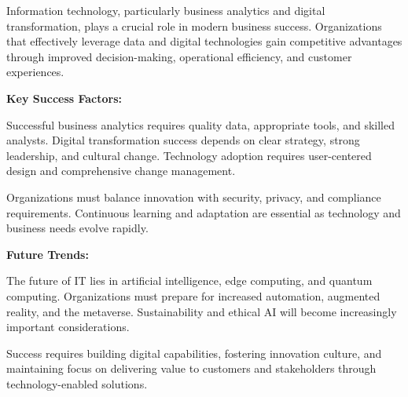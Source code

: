 \documentclass[12pt]{article}
\begin{document}
Information technology, particularly business analytics and digital transformation, plays a crucial role in modern business success. Organizations that effectively leverage data and digital technologies gain competitive advantages through improved decision-making, operational efficiency, and customer experiences.

\textbf{Key Success Factors:}

Successful business analytics requires quality data, appropriate tools, and skilled analysts. Digital transformation success depends on clear strategy, strong leadership, and cultural change. Technology adoption requires user-centered design and comprehensive change management.

Organizations must balance innovation with security, privacy, and compliance requirements. Continuous learning and adaptation are essential as technology and business needs evolve rapidly.

\textbf{Future Trends:}

The future of IT lies in artificial intelligence, edge computing, and quantum computing. Organizations must prepare for increased automation, augmented reality, and the metaverse. Sustainability and ethical AI will become increasingly important considerations.

Success requires building digital capabilities, fostering innovation culture, and maintaining focus on delivering value to customers and stakeholders through technology-enabled solutions.
\end{document}
